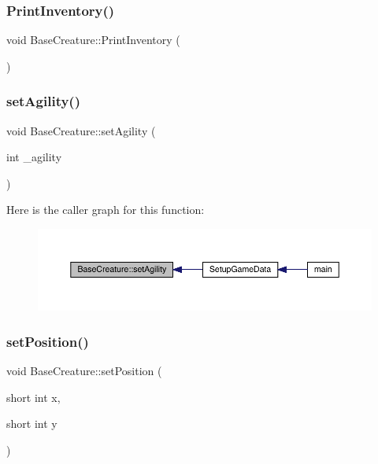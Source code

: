 \mbox{\label{class_base_creature_a097ec44d0b215f75ca75ae69c2bd11be}} 
\subsubsection{\texorpdfstring{Print\+Inventory()}{PrintInventory()}}
{\footnotesize\ttfamily void Base\+Creature\+::\+Print\+Inventory (\begin{DoxyParamCaption}{ }\end{DoxyParamCaption})}

\mbox{\label{class_base_creature_ad6357a6d4456d0b669abd1675efcca30}} 
\subsubsection{\texorpdfstring{set\+Agility()}{setAgility()}}
{\footnotesize\ttfamily void Base\+Creature\+::set\+Agility (\begin{DoxyParamCaption}\item[{int}]{\+\_\+agility }\end{DoxyParamCaption})}

Here is the caller graph for this function\+:
\nopagebreak
\begin{figure}[H]
\begin{center}
\leavevmode
\includegraphics[width=350pt]{class_base_creature_ad6357a6d4456d0b669abd1675efcca30_icgraph}
\end{center}
\end{figure}
\mbox{\label{class_base_creature_a00ffc1ee732a8f0a8921c9cee6842e4d}} 
\subsubsection{\texorpdfstring{set\+Position()}{setPosition()}}
{\footnotesize\ttfamily void Base\+Creature\+::set\+Position (\begin{DoxyParamCaption}\item[{short int}]{x,  }\item[{short int}]{y }\end{DoxyParamCaption})}

